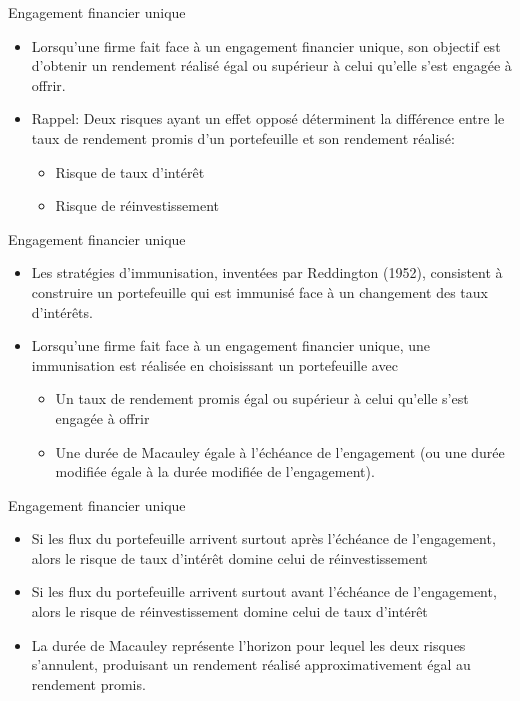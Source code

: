 \documentclass[10pt,a4paper]{beamer}
\begin{document}
\begin{frame}{Engagement financier unique}
\begin{itemize}[label=\bullet]
\item Lorsqu’une firme fait face à un engagement financier unique, son objectif est d’obtenir un rendement réalisé égal ou supérieur à celui qu’elle s’est engagée à offrir. 
\item Rappel: Deux risques ayant un effet opposé  déterminent la différence entre le taux de rendement promis d’un portefeuille et son rendement réalisé: 
\begin{itemize}[label=\bullet]
\item Risque de taux d’intérêt
\item Risque de réinvestissement
\end{itemize}
\end{itemize}
\end{frame}

\begin{frame}{Engagement financier unique}
\begin{itemize}[label=\bullet]
\item Les stratégies d’immunisation, inventées par Reddington (1952), consistent à construire un portefeuille qui est immunisé face à un changement des taux d’intérêts.   
\item Lorsqu’une firme fait face à un engagement financier unique, une immunisation est réalisée en choisissant un portefeuille avec 
\begin{itemize}[label=\bullet]
\item Un taux de rendement promis égal ou supérieur à celui qu’elle s’est engagée à offrir
\item Une durée de Macauley égale à l’échéance de l’engagement (ou une durée modifiée égale à la durée modifiée de l’engagement).
\end{itemize}
\end{itemize}
\end{frame}

\begin{frame}{Engagement financier unique}
\begin{itemize}[label=\bullet]
\item Si les flux du portefeuille arrivent surtout après l’échéance de l’engagement, alors le risque de taux d’intérêt domine celui de réinvestissement
\item Si les flux du portefeuille arrivent surtout avant l’échéance de l’engagement, alors le risque de réinvestissement domine celui de taux d’intérêt
\item La durée de Macauley représente l’horizon pour lequel les deux risques s’annulent, produisant un rendement réalisé approximativement égal au rendement promis.
\end{itemize}
\end{frame}
\end{document}
